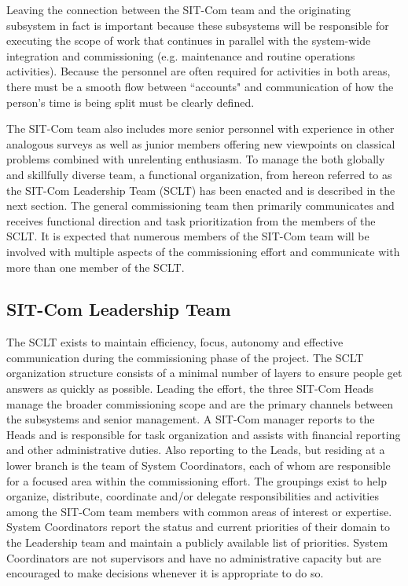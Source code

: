 \documentclass[SE,lsstdraft,authoryear,toc]{lsstdoc}
\begin{document}
Leaving the connection between the SIT-Com team and the originating subsystem in fact is important because these subsystems will be responsible for executing the scope of work that continues in parallel with the system-wide integration and commissioning (e.g. maintenance and routine operations activities).
Because the personnel are often required for activities in both areas, there must be a smooth flow between ``accounts" and communication of how the person's time is being split must be clearly defined.

The SIT-Com team also includes more senior personnel with experience in other analogous surveys as well as junior members offering new viewpoints on classical problems combined with unrelenting enthusiasm.
To manage the both globally and skillfully diverse team, a functional organization, from hereon referred to as the SIT-Com Leadership Team (SCLT) has been enacted and is described in the next section.
The general commissioning team then primarily communicates and receives functional direction and task prioritization from the members of the SCLT.
It is expected that numerous members of the SIT-Com team will be involved with multiple aspects of the commissioning effort and communicate with more than one member of the SCLT.

\subsection{SIT-Com Leadership Team}
\label{sec:SCLT}

The SCLT exists to maintain efficiency, focus, autonomy and effective communication during the commissioning phase of the project.
The SCLT organization structure consists of a minimal number of layers to ensure people get answers as quickly as possible.
Leading the effort, the three SIT-Com Heads manage the broader commissioning scope and are the primary channels between the subsystems and senior management.
A SIT-Com manager reports to the Heads and is responsible for task organization and assists with financial reporting and other administrative duties.
Also reporting to the Leads, but residing at a lower branch is the team of System Coordinators, each of whom are responsible for a focused area within the commissioning effort.
The groupings exist to help organize, distribute, coordinate and/or delegate responsibilities and activities among the SIT-Com team members with common areas of interest or expertise.
System Coordinators report the status and current priorities of their domain to the Leadership team and maintain a publicly available list of priorities.
System Coordinators are not supervisors and have no administrative capacity but are encouraged to make decisions whenever it is appropriate to do so.
\end{document}
